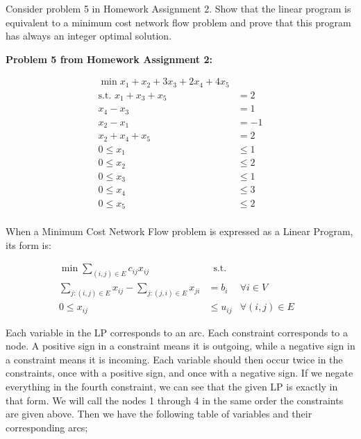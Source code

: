 \documentclass[fleqn]{homework}
\begin{document}
  \begin{problem}{7}
    \begin{question}
      Consider problem 5 in Homework Assignment 2. Show that the linear program
      is equivalent to a minimum cost network flow problem and prove that this
      program has always an integer optimal solution.

      \textbf{Problem 5 from Homework Assignment 2:}

      \begin{align*}
        \min x_1 + x_2 + 3x_3 + 2x_4 + 4x_5 & \\
        \text{s.t. } x_1 + x_3 + x_5 &= 2 \\
        x_4 - x_3 &= 1 \\
        x_2 - x_1 &= -1 \\
        x_2 + x_4 + x_5 &= 2 \\
        0 \le x_1 &\le 1 \\
        0 \le x_2 &\le 2 \\
        0 \le x_3 &\le 1 \\
        0 \le x_4 &\le 3 \\
        0 \le x_5 &\le 2 \\
      \end{align*}
    \end{question}

    When a Minimum Cost Network Flow problem is expressed as a Linear Program,
    its form is:

    \begin{alignat*}{2}
      \min \sum_{(i,j) \in E} c_{ij} x_{ij} &\: \text{ s.t.} && \\
      \sum_{j: (i,j) \in E} x_{ij} - \sum_{j: (j,i) \in E} x_{ji} &= b_i &\forall i \in V&\\
      0 \le x_{ij} &\le u_{ij} & \forall (i,j) \in E &
    \end{alignat*}

    Each variable in the LP corresponds to an arc.  Each constraint corresponds
    to a node.  A positive sign in a constraint means it is outgoing, while a
    negative sign in a constraint means it is incoming.  Each variable should
    then occur twice in the constraints, once with a positive sign, and once
    with a negative sign.  If we negate everything in the fourth constraint, we
    can see that the given LP is exactly in that form.  We will call the nodes 1
    through 4 in the same order the constraints are given above.  Then we have
    the following table of variables and their corresponding arcs;


\end{problem}
\end{document}
